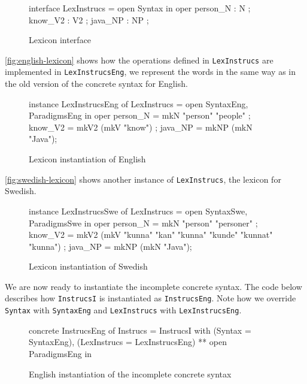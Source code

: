 \begin{figure}[H]
\begin{code}
interface LexInstrucs = open Syntax in {
   oper
     person_N : N ;
     know_V2 : V2 ;
     java_NP : NP ;
}
\end{code}
\caption{Lexicon interface\label{fig:lexicon-interface}}
\end{figure}

\autoref{fig:english-lexicon} shows how the operations defined in \texttt{LexInstrucs} are implemented in \texttt{LexInstrucsEng}, we represent the words in the same  way as in the old version of the concrete syntax for English.

\begin{figure}[H]
\begin{code}
instance LexInstrucsEng of LexInstrucs = open SyntaxEng, ParadigmsEng in {
    oper
      person_N = mkN "person" "people" ;
      know_V2 = mkV2 (mkV "know") ;	  
      java_NP = mkNP (mkN "Java");
}
\end{code}
\caption{Lexicon instantiation of English \label{fig:english-lexicon}}
\end{figure}

\autoref{fig:swedish-lexicon} shows another instance of \texttt{LexInstrucs}, the lexicon for Swedish.

\begin{figure}[H]
\begin{code}
instance LexInstrucsSwe of LexInstrucs = open SyntaxSwe, ParadigmsSwe in {
    oper
      person_N = mkN "person" "personer" ;
      know_V2 = mkV2 (mkV "kunna" "kan" "kunna" "kunde" "kunnat" "kunna") ;	  
      java_NP = mkNP (mkN "Java");
}
\end{code}
\caption{Lexicon instantiation of Swedish\label{fig:swedish-lexicon}}
\end{figure}

We are now ready to instantiate the incomplete concrete syntax. The code below describes how \texttt{InstrucsI} is instantiated as \texttt{InstrucsEng}. Note how we override \texttt{Syntax} with \texttt{SyntaxEng} and \texttt{LexInstrucs} with \texttt{LexInstrucsEng}.

\begin{figure}[H]
\begin{code}
concrete InstrucsEng of Instrucs = InstrucsI with 
                                         (Syntax = SyntaxEng), 
                                         (LexInstrucs = LexInstrucsEng) 
                                         ** open ParadigmsEng in {}
\end{code}
\caption{English instantiation of the incomplete concrete syntax}
\end{figure}

